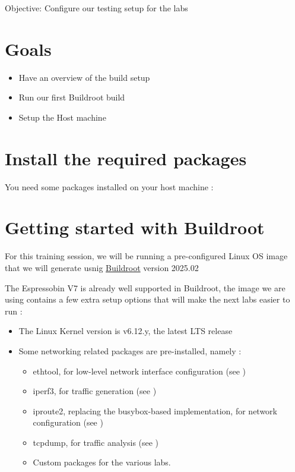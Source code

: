 {Objective: Configure our testing setup for the labs}

\section{Goals}

\begin{itemize}
\item Have an overview of the build setup
\item Run our first Buildroot build
\item Setup the Host machine
\end{itemize}

\section{Install the required packages}

You need some packages installed on your host machine :


\section{Getting started with Buildroot}

For this training session, we will be running a pre-configured Linux OS image that
we will generate usnig \href{https://buildroot.org/}{Buildroot} version 2025.02

The Espressobin V7 is already well supported in Buildroot, the image we are using
contains a few extra setup options that will make the next labs easier to run :

\begin{itemize}
	\item The Linux Kernel version is v6.12.y, the latest LTS release
	\item Some networking related packages are pre-installed, namely :
		\begin{itemize}
			\item ethtool, for low-level network interface configuration (see )
			\item iperf3, for traffic generation (see \manpage{iperf3}{1})
			\item iproute2, replacing the busybox-based implementation, for network configuration (see )
			\item tcpdump, for traffic analysis (see \manpage{tcpdump}{8})
			\item Custom packages for the various labs.
		\end{itemize}
\end{itemize}

